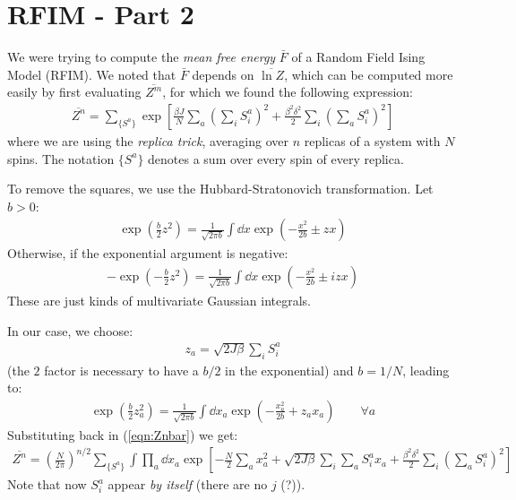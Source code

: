 \documentclass[../template.tex]{subfiles}
\begin{document}
\section{RFIM - Part 2}
We were trying to compute the \textit{mean free energy} $\bar{F}$ of a Random Field Ising Model (RFIM). We noted that $\bar{F}$ depends on $\overline{\ln Z}$, which can be computed more easily by first evaluating $\overline{Z^m}$, for which we found the following expression:
\begin{align}
    \overline{Z^n} = \sum_{\{S^a\}} \exp\left[\frac{\beta J}{N} \sum_a \left(\sum_i S_i^a\right)^2 + \frac{\beta^2 \delta^2}{2} \sum_i \left(\sum_a S_i^a\right)^2 \right]
    \label{eqn:Znbar}
\end{align}   
where we are using the \textit{replica trick}, averaging over $n$ replicas of a system with $N$ spins. The notation $\{S^a\}$ denotes a sum over every spin of every replica. 

To remove the squares, we use the Hubbard-Stratonovich transformation. Let $b > 0$: 
\begin{align*}
    \exp\left(\frac{b}{2} z^2 \right) = \frac{1}{\sqrt{2 \pi b}} \int \dd{x} \exp\left(-\frac{x^2}{2b} \pm zx \right) 
\end{align*}
Otherwise, if the exponential argument is negative:
\begin{align*}
    -\exp\left(-\frac{b}{2}z^2 \right) = \frac{1}{\sqrt{2 \pi b}} \int \dd{x} \exp\left(-\frac{x^2}{2b} \pm i z x\right) 
\end{align*} 
These are just kinds of multivariate Gaussian integrals.

\medskip
In our case, we choose:
\begin{align*}
    z_a = \sqrt{2 J \beta} \sum_i S_i^a
\end{align*}
(the $2$ factor is necessary to have a $b/2$ in the exponential) and $b = 1/N$, leading to:
\begin{align*}
    \exp\left(\frac{b}{2} z_a^2 \right) = \frac{1}{\sqrt{2 \pi b}} \int \dd{x_a} \exp\left(-\frac{x_a^2}{2b} + z_a x_a \right)  \qquad \forall a
\end{align*} 
Substituting back in (\ref{eqn:Znbar}) we get:
\begin{align*}
    \overline{Z^n} = \left(\frac{N}{2 \pi} \right)^{n/2} \sum_{\{S^a\}} \int \prod_a \dd{x_a} \exp\left[-\frac{N}{2} \sum_a x^2_a + \sqrt{2J \beta} \sum_i \sum_a S_i^a x_a + \frac{\beta^2 \delta^2}{2} \sum_i \left(\sum_a S_i^a \right)^2 \right]
\end{align*}
Note that now $S_i^a$ appear \textit{by itself} (there are no $j$ (?)).
\end{document}
